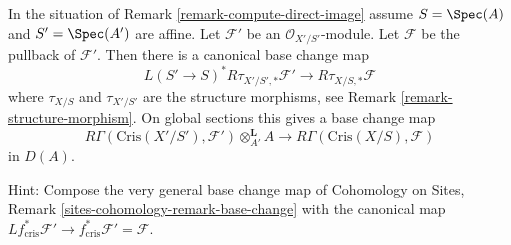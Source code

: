 \begin{remark}
\label{remark-base-change}
In the situation of Remark \ref{remark-compute-direct-image}
assume $S = \Spec(A)$ and $S' = \Spec(A')$ are affine.
Let $\mathcal{F}'$ be an $\mathcal{O}_{X'/S'}$-module.
Let $\mathcal{F}$ be the pullback of $\mathcal{F}'$.
Then there is a canonical base change map
$$
L(S' \to S)^*R\tau_{X'/S', *}\mathcal{F}'
\longrightarrow
R\tau_{X/S, *}\mathcal{F}
$$
where $\tau_{X/S}$ and $\tau_{X'/S'}$ are the structure morphisms, see
Remark \ref{remark-structure-morphism}. On global sections this
gives a base change map
\begin{equation}
\label{equation-base-change-map}
R\Gamma(\text{Cris}(X'/S'), \mathcal{F}') \otimes^\mathbf{L}_{A'} A
\longrightarrow
R\Gamma(\text{Cris}(X/S), \mathcal{F})
\end{equation}
in $D(A)$.

\medskip\noindent
Hint: Compose the very general base change map of
Cohomology on Sites, Remark \ref{sites-cohomology-remark-base-change}
with the canonical map
$Lf_{\text{cris}}^*\mathcal{F}' \to
f_{\text{cris}}^*\mathcal{F}' = \mathcal{F}$.
\end{remark}


